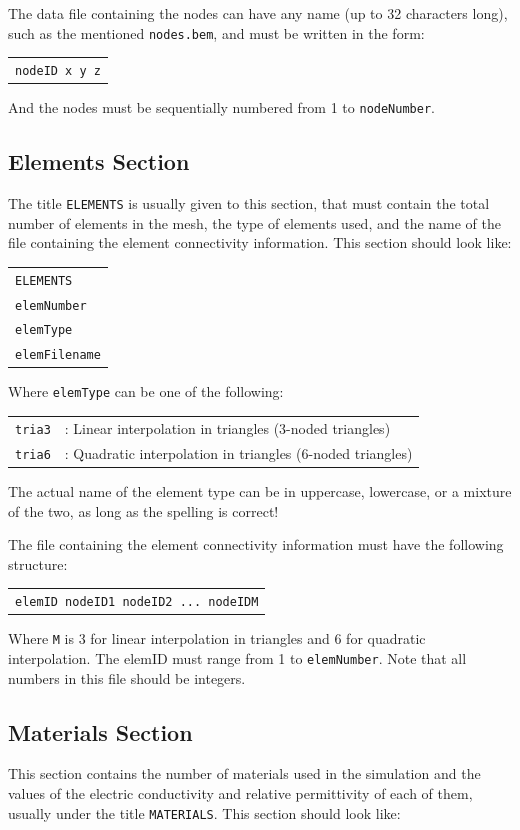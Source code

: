 \documentclass[12pt]{article}
\begin{document}
The data file containing the nodes can have any name (up to 32 characters long), such as the mentioned \verb+nodes.bem+, and must be written in the form:

\begin{tabular}{l}
\texttt{nodeID x y z}
\end{tabular}

And the nodes must be sequentially numbered from 1 to \verb+nodeNumber+.

\subsection{Elements Section}
The title \verb+ELEMENTS+ is usually given to this section, that must contain the total number of elements in the mesh, the type of elements used, and the name of the file containing the element connectivity information. This section should look like:

\begin{tabular}{l}
\texttt{ELEMENTS}\\
\texttt{elemNumber}\\
\texttt{elemType}\\
\texttt{elemFilename}
\end{tabular}

Where \verb+elemType+ can be one of the following:

\begin{tabular}{ll}
\texttt{tria3}&: Linear interpolation in triangles (3-noded triangles)\\
\texttt{tria6}&: Quadratic interpolation in triangles (6-noded triangles)
\end{tabular}

The actual name of the element type can be in uppercase, lowercase, or a mixture of the two, as long as the spelling is correct!

The file containing the element connectivity information must have the following structure:

\begin{tabular}{l}
\texttt{elemID nodeID1 nodeID2	... nodeIDM}
\end{tabular}

Where \verb+M+ is 3 for linear interpolation in triangles and 6 for quadratic interpolation. The elemID must range from 1 to \verb+elemNumber+. Note that all numbers in this file should be integers.

\subsection{Materials Section}
This section contains the number of materials used in the simulation and the values of the electric conductivity and relative permittivity of each of them, usually under the title \verb+MATERIALS+. This section should look like:
\end{document}
